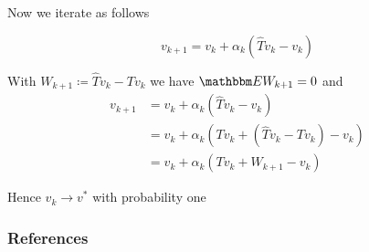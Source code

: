 \documentclass[xcolor=dvipsnames]{beamer}  %
\newcommand{\1}{\mathbbm 1}
\newcommand{\EE}{\mathbbm E}
\begin{document}
\begin{frame}
    
    Now we iterate as follows

    \begin{equation*}
        v_{k+1} = v_k + \alpha_k (\hat T v_k - v_k)
    \end{equation*}

    \medskip

    With $W_{k+1} \coloneq \hat Tv_k - Tv_k$ we have $\EE W_{k+1} = 0$ and
    \begin{align*}
        v_{k+1} 
        & = v_k + \alpha_k (\hat T v_k - v_k)
        \\
        & = v_k + \alpha_k (Tv_k + (\hat T v_k - Tv_k) - v_k)
        \\
        & = v_k + \alpha_k (Tv_k + W_{k+1} - v_k)
    \end{align*}


    Hence $v_k \to v^*$ with probability one

\end{frame}


\begin{frame}[allowframebreaks]
    \frametitle{References}

    

    

\end{frame}
\end{document}
